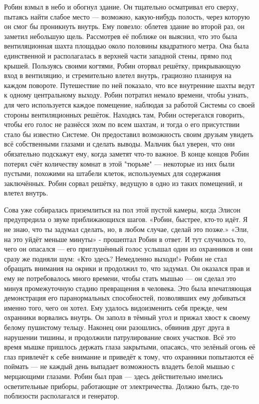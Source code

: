 \documentclass[a4paper,12pt]{book}
\begin{document}
	Робин взмыл в небо и обогнул здание. Он тщательно осматривал его сверху, пытаясь найти слабое место — возможно, какую-нибудь полость, через которую он смог бы проникнуть внутрь. Ему повезло: облетев здание во второй раз, он заметил небольшую щель. Рассмотрев её поближе он выяснил, что это была вентиляционная шахта площадью около половины квадратного метра. Она была единственной и располагалась в верхней части западной стены, прямо под крышей. Пользуясь своими когтями, Робин оторвал решётку, прикрывающую вход в вентиляцию, и стремительно влетел внутрь, грациозно планируя на каждом повороте. Путешествие по ней показало, что все внутренние шахты ведут к одному центральному выходу. Робин потратил немало времени, чтобы узнать, для чего используется каждое помещение, наблюдая за работой Системы со своей стороны вентиляционных решёток.
	Находясь там, Робин остерегался говорить, чтобы его голос не разнёсся эхом по всем шахтам, и тогда о его присутствии стало бы известно Системе. Он предоставил возможность своим друзьям увидеть всё собственными глазами и сделать выводы. Мальчик был уверен, что они обязательно подскажут ему, когда заметят что-то важное. В конце концов Робин потерял счёт количеству комнат в этой "тюрьме" — некоторые из них были пустыми, похожими на штабели клеток, используемых для содержания заключённых. Робин сорвал решётку, ведущую в одно из таких помещений, и влетел внутрь.

	Сова уже собиралась приземлиться на пол этой пустой камеры, когда Элисон предупредила о звуке приближающихся шагов.
	«Робин, быстрее, кто-то идёт. Я не знаю, что ты задумал сделать, но, в любом случае, сделай это позже.»
	«Эли, на это уйдёт меньше минуты» - прошептал Робин в ответ.
	И тут случилось то, чего он опасался — его приглушённый голос услышал один из охранников и они сразу же подняли шум:
	«Кто здесь? Немедленно выходи!»
	Робин не стал обращать внимания на окрики и продолжил то, что задумал. Он оказался прав и ему не потребовалось много времени, чтобы стать мышью — он сделал это минуя промежуточную стадию превращения в человека. Это была впечатляющая демонстрация его паранормальных способностей, позволявших ему добиваться именно того, чего он хотел. Ему удалось видоизменить себя прежде, чем охранники ворвались внутрь. Он заполз в тёмный угол и прижал хвост к своему белому пушистому тельцу. Наконец они разошлись, обвинив друг друга в нарушении тишины, и продолжили патрулирование своих участков. Всё это время мышке пришлось держать глаза закрытыми, опасаясь, что зелёный огонь её глаз привлечёт к себе внимание и приведёт к тому, что охранники попытаются её поймать — не каждый день выпадает возможность владеть белой мышью с мерцающими глазами.
	Робин был прав — здесь действительно имелись осветительные приборы, работающие от электричества. Должно быть, где-то поблизости располагался и генератор.
\end{document}
